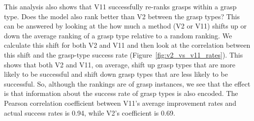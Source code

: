 This analysis also shows that V11 successfully re-ranks grasps within a grasp type. Does the model also rank better than V2 between the grasp types? This can be answered by looking at the how much a method (V2 or V11) shifts up or down the average ranking of a grasp type relative to a random ranking. We calculate this shift for both V2 and V11 and then look at the correlation between this shift and the grasp-type success rate (Figure~\ref{fig:v2_vs_v11_rates}). This shows that both V2 and V11, on average, shift up grasp types that are more likely to be successful and shift down grasp types that are less likely to be successful. So, although the rankings are of grasp instances, we see that the effect is that information about the success rate of grasp types is also encoded. The Pearson correlation coefficient between V11's average improvement rates and actual success rates is 0.94, while V2's coefficient is 0.69.




